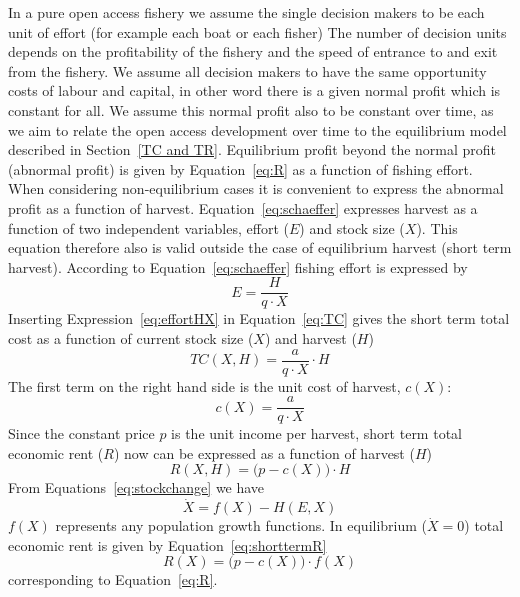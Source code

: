 \documentclass[11pt,fleqn]{book} %
\begin{document}
In a pure open access fishery we assume the single decision makers to be each unit of effort (for example each boat or each fisher) The number of decision units depends on the profitability of the fishery and the speed of entrance to and exit from the fishery. We assume all decision makers to have the same opportunity costs of labour and capital, in other word there is a given normal profit which is constant for all. We assume this normal profit also to be constant over time, as we aim to relate the open access development over time to the equilibrium model described in Section~\ref{TC and TR}. Equilibrium profit beyond the normal profit (abnormal profit) is given by Equation~\ref{eq:R} as a function of fishing effort. When considering non-equilibrium cases it is convenient to express the abnormal profit as a function of harvest. Equation~\ref{eq:schaeffer} expresses harvest as a function of two independent variables, effort ($E$) and stock size ($X$). This equation therefore also is valid outside the case of equilibrium harvest (short term harvest). According to Equation~\ref{eq:schaeffer} fishing effort is expressed by
\begin{equation} 
\label{eq:effortHX}
E = \frac{H}{q \cdot X}
\end{equation}
Inserting Expression~\ref{eq:effortHX} in Equation~\ref{eq:TC} gives the short term total cost as a function of current stock size ($X$) and harvest ($H$)
\begin{equation} 
\label{eq:shorttermTC}
TC(X,H) = \frac{a}{q \cdot X} \cdot H
\end{equation}
The first term on the right hand side is the unit cost of harvest, $c(X)$:
\begin{equation} 
\label{eq:unitcostH}
c(X) = \frac{a}{q \cdot X}
\end{equation}
Since the constant price $p$ is the unit income per harvest, short term total economic rent ($R$) now can be expressed as a function of harvest ($H$)
\begin{equation} 
\label{eq:shorttermR}
R(X,H) = \Big( p - c(X) \Big) \cdot H
\end{equation}
From Equations~\ref{eq:stockchange} we have
\begin{equation*} 
\dot{X} = f(X) - H(E, X)
\end{equation*}
$f(X)$ represents any population growth functions. In equilibrium ($\dot{X} = 0$) total economic rent is given by Equation~\ref{eq:shorttermR}
\begin{equation} 
\label{eq:RX}
R(X) = \Big( p - c(X) \Big) \cdot f(X)
\end{equation}
corresponding to Equation~\ref{eq:R}.
\end{document}
